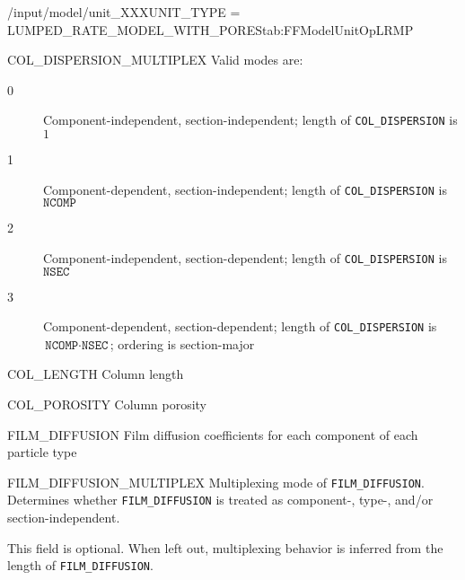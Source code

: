 \begin{condsubgroup}{/input/model/unit\_XXX}{UNIT\_TYPE = LUMPED\_RATE\_MODEL\_WITH\_PORES}{tab:FFModelUnitOpLRMP}
\begin{dataset}[unit=--,type=int,range={$\{0, \dots, 3 \}$},length={1}]{COL\_DISPERSION\_MULTIPLEX}
    Valid modes are:
    \begin{description}
      \item[0] Component-independent, section-independent; length of \texttt{COL\_DISPERSION} is $1$
      \item[1] Component-dependent, section-independent; length of \texttt{COL\_DISPERSION} is $\texttt{NCOMP}$
      \item[2] Component-independent, section-dependent; length of \texttt{COL\_DISPERSION} is $\texttt{NSEC}$
      \item[3] Component-dependent, section-dependent; length of \texttt{COL\_DISPERSION} is $\texttt{NCOMP} \cdot \texttt{NSEC}$; ordering is section-major
    \end{description}\vspace{-\baselineskip}
  \end{dataset}
  \begin{dataset}[unit=\si{\metre},type=double,range={$> 0$},length={1}]{COL\_LENGTH}
    Column length
  \end{dataset}
  \begin{dataset}[unit=--,type=double,range={$(0,1]$},length={1}]{COL\_POROSITY}
    Column porosity
  \end{dataset}
  \begin{dataset}[unit=\si{\metre\per\second},type=double,range={$\geq 0$},length={see \texttt{FILM\_DIFFUSION\_MULTIPLEX}}]{FILM\_DIFFUSION}
    Film diffusion coefficients for each component of each particle type
  \end{dataset}
  \begin{dataset}[unit=--,type=int,range={$\{0, \dots, 3 \}$},length={1}]{FILM\_DIFFUSION\_MULTIPLEX}
    Multiplexing mode of \texttt{FILM\_DIFFUSION}.
    Determines whether \texttt{FILM\_DIFFUSION} is treated as component-, type-, and/or section-independent.

    This field is optional.
    When left out, multiplexing behavior is inferred from the length of \texttt{FILM\_DIFFUSION}.


\end{dataset}
\end{condsubgroup}

